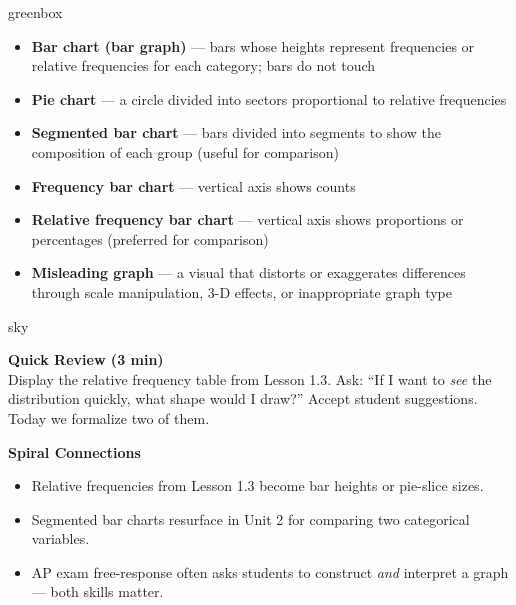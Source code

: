 \documentclass[10pt]{article}
\begin{document}
\begin{skillbox}{greenbox}
\begin{minipage}[t]{0.48\linewidth}
    \begin{itemize}
        \item \textbf{Bar chart (bar graph)} --- bars whose heights represent frequencies or relative frequencies for each category; bars do not touch
        \item \textbf{Pie chart} --- a circle divided into sectors proportional to relative frequencies
        \item \textbf{Segmented bar chart} --- bars divided into segments to show the composition of each group (useful for comparison)
    \end{itemize}
\end{minipage}
\hfill
\begin{minipage}[t]{0.48\linewidth}
    \begin{itemize}
        \item \textbf{Frequency bar chart} --- vertical axis shows counts
        \item \textbf{Relative frequency bar chart} --- vertical axis shows proportions or percentages (preferred for comparison)
        \item \textbf{Misleading graph} --- a visual that distorts or exaggerates differences through scale manipulation, 3-D effects, or inappropriate graph type
    \end{itemize}
\end{minipage}
\end{skillbox}

\begin{skillbox}{sky}
\begin{minipage}[t]{0.48\linewidth}
    \textbf{Quick Review (3 min)}\\
    Display the relative frequency table from Lesson 1.3. Ask: ``If I want to \textit{see} the distribution quickly, what shape would I draw?'' Accept student suggestions. Today we formalize two of them.
\end{minipage}
\hfill
\begin{minipage}[t]{0.48\linewidth}
    \textbf{Spiral Connections}
    \begin{itemize}
        \item Relative frequencies from Lesson 1.3 become bar heights or pie-slice sizes.
        \item Segmented bar charts resurface in Unit 2 for comparing two categorical variables.
        \item AP exam free-response often asks students to construct \textit{and} interpret a graph --- both skills matter.
    \end{itemize}
\end{minipage}
\end{skillbox}
\end{document}
